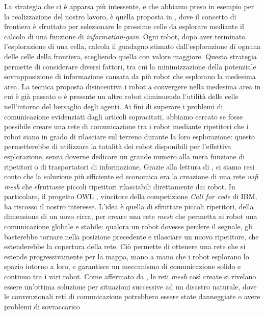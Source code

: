 La strategia che ci è apparsa più intessente, e che abbiamo preso in esempio per la realizzazione del nostro lavoro, è quella proposta in \cite{burgard2005}, dove il concetto di frontiera è sfruttato per selezionare le prossime celle da esplorare mediante il calcolo di una funzione di \textit{information-gain}.
Ogni robot, dopo aver terminato l'esplorazione di una cella, calcola il guadagno stimato dall'esplorazione di ognuna delle celle della frontiera, scegliendo quella con valore maggiore.
Questa strategia permette di considerare diversi fattori, tra cui la minimizzazione della potenziale sovrapposizione di informazione causata da più robot che esplorano la medesima area. La tecnica proposta disincentiva i robot a convergere nella medesima area in cui è già passato o è presente un altro robot diminuendo l'utilità delle celle nell'intorno del bersaglio degli agenti.
Ai fini di superare i problemi di comunicazione evidenziati dagli articoli sopracitati, abbiamo cercato se fosse possibile creare una rete di comunicazione tra i robot mediante ripetitori che i robot siano in grado di rilasciare sul terreno durante la loro esplorazione: questo permetterebbe di utilizzare la totalità dei robot disponibili per l'effettiva esplorazione, senza doverne dedicare un grande numero alla mera funzione di ripetitori o di trasportatori di informazione. Grazie alla lettura di \cite{yarali2009wireless}, ci siamo resi conto che la soluzione più efficiente ed economica era la creazione di una rete \textit{wifi mesh} che sfruttasse piccoli ripetitori rilasciabili direttamente dai robot. In particolare, il progetto OWL \cite{OWL}, vincitore della competizione \textit{Call for code} di IBM, ha riscosso il nostro interesse. L'idea è quella di sfruttare piccoli ripetitori, della dimensione di un uovo circa, per creare una rete \textit{mesh} che permetta ai robot una comunicazione globale e stabile: qualora un robot dovesse perdere il segnale, gli basterebbe tornare nella posizione precedente e rilasciare un nuovo ripetitore, che estenderebbe la copertura della rete. Ciò permette di ottenere una rete che si estende progressivamente per la mappa, mano a mano che i robot esplorano lo spazio intorno a loro, e garantisce un meccanismo di comunicazione solido e continuo tra i vari robot. Come affermato da \cite{yarali2009wireless}, le reti \textit{mesh} così create si rivelano essere un'ottima soluzione per situazioni successive ad un disastro naturale, dove le convenzionali reti di comunicazione potrebbero essere state danneggiate o avere problemi di sovraccarico 
